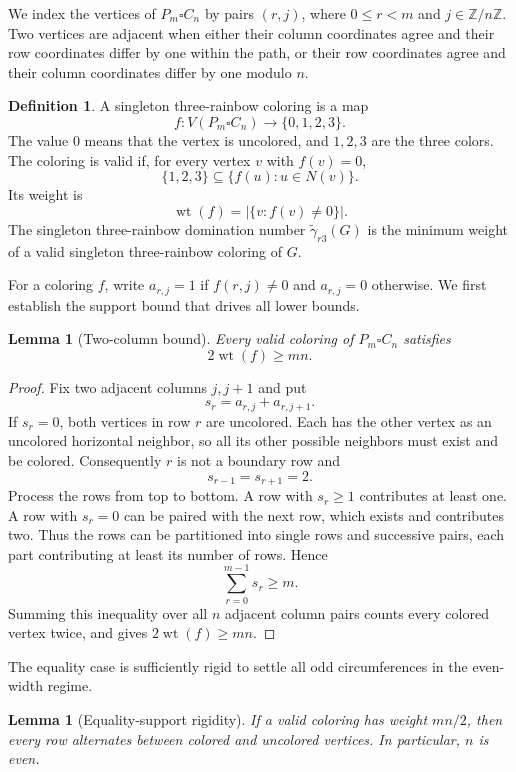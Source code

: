 \documentclass[11pt]{article}
\newtheorem{lemma}[theorem]{Lemma}
\theoremstyle{definition}
\newtheorem{definition}[theorem]{Definition}
\theoremstyle{remark}
\newcommand{\Z}{\mathbb Z}
\newcommand{\wt}{\operatorname{wt}}
\newcommand{\srdom}{\widetilde\gamma_{r3}}
\begin{document}
We index the vertices of $P_m\square C_n$ by pairs $(r,j)$, where $0\leq r<m$ and $j\in\Z/n\Z$. Two vertices are adjacent when either their column coordinates agree and their row coordinates differ by one within the path, or their row coordinates agree and their column coordinates differ by one modulo $n$.

\begin{definition}
A singleton three-rainbow coloring is a map
\[
 f:V(P_m\square C_n)\longrightarrow\{0,1,2,3\}.
\]
The value $0$ means that the vertex is uncolored, and $1,2,3$ are the three colors. The coloring is valid if, for every vertex $v$ with $f(v)=0$,
\[
 \{1,2,3\}\subseteq\{f(u):u\in N(v)\}.
\]
Its weight is
\[
 \wt(f)=\bigl|\{v:f(v)\neq 0\}\bigr|.
\]
The singleton three-rainbow domination number $\srdom(G)$ is the minimum weight of a valid singleton three-rainbow coloring of $G$.
\end{definition}

For a coloring $f$, write $a_{r,j}=1$ if $f(r,j)\neq 0$ and $a_{r,j}=0$ otherwise. We first establish the support bound that drives all lower bounds.

\begin{lemma}[Two-column bound]\label{lem:two-column}
Every valid coloring of $P_m\square C_n$ satisfies
\[
 2\wt(f)\geq mn.
\]
\end{lemma}

\begin{proof}
Fix two adjacent columns $j,j+1$ and put
\[
 s_r=a_{r,j}+a_{r,j+1}.
\]
If $s_r=0$, both vertices in row $r$ are uncolored. Each has the other vertex as an uncolored horizontal neighbor, so all its other possible neighbors must exist and be colored. Consequently $r$ is not a boundary row and
\[
 s_{r-1}=s_{r+1}=2.
\]
Process the rows from top to bottom. A row with $s_r\geq 1$ contributes at least one. A row with $s_r=0$ can be paired with the next row, which exists and contributes two. Thus the rows can be partitioned into single rows and successive pairs, each part contributing at least its number of rows. Hence
\[
 \sum_{r=0}^{m-1}s_r\geq m.
\]
Summing this inequality over all $n$ adjacent column pairs counts every colored vertex twice, and gives $2\wt(f)\geq mn$.
\end{proof}

The equality case is sufficiently rigid to settle all odd circumferences in the even-width regime.

\begin{lemma}[Equality-support rigidity]\label{lem:rigidity}
If a valid coloring has weight $mn/2$, then every row alternates between colored and uncolored vertices. In particular, $n$ is even.
\end{lemma}
\end{document}
